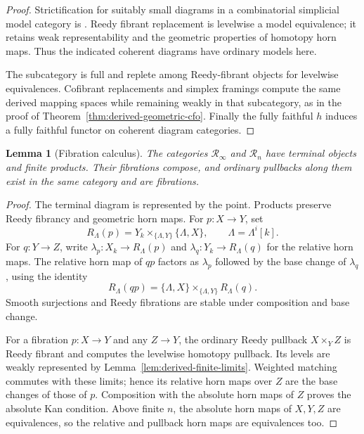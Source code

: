 \documentclass[12pt]{amsart}
\newtheorem{lem}[thm]{Lemma}
\theoremstyle{definition}
\theoremstyle{remark}
\numberwithin{equation}{section}
\begin{document}
\begin{proof}
Strictification for suitably small diagrams in a combinatorial
simplicial model category is
\cite[Proposition~4.2.4.4, p.~258]{LurieHTT2009}.
Reedy fibrant replacement is levelwise a model equivalence;
it retains weak representability and the geometric properties
of homotopy horn maps. Thus the indicated coherent diagrams
have ordinary models here.

The subcategory is full and replete among Reedy-fibrant
objects for levelwise equivalences. Cofibrant replacements
and simplex framings compute the same derived mapping
spaces while remaining weakly in that subcategory, as in
the proof of Theorem~\ref{thm:derived-geometric-cfo}.
Finally the fully faithful $h$ induces a fully faithful
functor on coherent diagram categories.
\end{proof}

\begin{lem}[Fibration calculus]\label{lem:derived-reedy-calculus}
The categories $\mathscr R_\infty$ and $\mathscr R_n$
have terminal objects and finite products. Their fibrations
compose, and ordinary pullbacks along them exist in the same
category and are fibrations.
\end{lem}

\begin{proof}
The terminal diagram is represented by the point.
Products preserve Reedy fibrancy and geometric horn maps.
For $p:X\to Y$, set
\[
 R_\Lambda(p)=Y_k\times_{\{\Lambda,Y\}}\{\Lambda,X\},
 \qquad \Lambda=\Lambda^i[k].
\]
For $q:Y\to Z$, write $\lambda_p:X_k\to R_\Lambda(p)$ and
$\lambda_q:Y_k\to R_\Lambda(q)$ for the relative horn maps.
The relative horn map of $qp$ factors as $\lambda_p$ followed
by the base change of $\lambda_q$, using the identity
\[
 R_\Lambda(qp)
 =\{\Lambda,X\}\times_{\{\Lambda,Y\}}R_\Lambda(q).
\]
Smooth surjections and Reedy fibrations are stable under
composition and base change.

For a fibration $p:X\to Y$ and any $Z\to Y$, the ordinary
Reedy pullback $X\times_Y Z$ is Reedy fibrant and computes
the levelwise homotopy pullback. Its levels are weakly
represented by Lemma~\ref{lem:derived-finite-limits}.
Weighted matching commutes with these limits; hence its
relative horn maps over $Z$ are the base changes of those
of $p$. Composition with the absolute horn maps of $Z$
proves the absolute Kan condition. Above finite $n$, the
absolute horn maps of $X,Y,Z$ are equivalences, so the
relative and pullback horn maps are equivalences too.
\end{proof}
\end{document}
